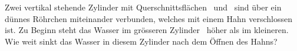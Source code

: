 Zwei vertikal stehende Zylinder mit Querschnittsflächen \AkO\ und \AgO\ sind über ein dünnes Röhrchen miteinander verbunden, welches mit einem Hahn verschlossen ist. Zu Beginn steht das Wasser im grösseren Zylinder \hUO\ höher als im kleineren. Wie weit sinkt das Wasser in diesem Zylinder nach dem Öffnen des Hahns?
